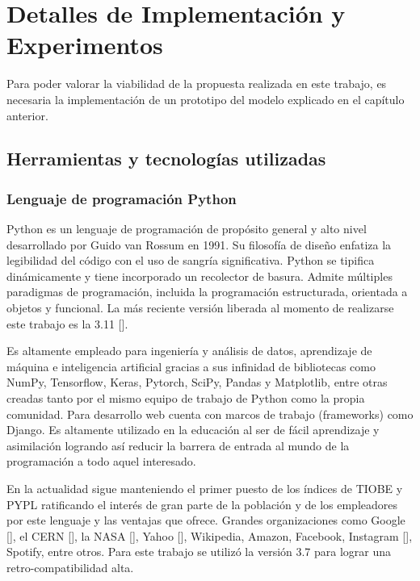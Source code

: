 \chapter{Detalles de Implementación y Experimentos}\label{chapter:implementation}
Para poder valorar la viabilidad de la propuesta realizada en este trabajo, es
necesaria la implementación de un prototipo del modelo explicado en el capítulo
anterior.

\section{Herramientas y tecnologías utilizadas}\label{section:implementation:techs}
\subsection{Lenguaje de programación Python}
Python es un lenguaje de programación de propósito general y alto nivel desarrollado por Guido van Rossum en 1991. Su filosofía de diseño enfatiza la legibilidad del código con el uso de sangría significativa. Python se tipifica dinámicamente y tiene incorporado un recolector de basura. Admite múltiples paradigmas de programación, incluida la programación estructurada, orientada a objetos y funcional. La más reciente  versión liberada al momento de realizarse este trabajo es la 3.11 [\cite{python_executive_summary_2022}].

Es altamente empleado para ingeniería y análisis de datos, aprendizaje de máquina
e inteligencia artificial gracias a sus infinidad de bibliotecas como NumPy, Tensorflow, Keras, Pytorch, SciPy, Pandas y Matplotlib, entre otras creadas tanto por el mismo equipo de trabajo de Python como la propia comunidad. Para desarrollo web cuenta con marcos de trabajo (frameworks) como Django. Es altamente utilizado en la educación al ser de fácil aprendizaje y asimilación logrando así reducir la barrera de entrada al mundo de la programación a todo aquel interesado.

 En la actualidad sigue manteniendo el primer puesto de los índices de TIOBE y PYPL ratificando el interés de gran parte de la población y de los empleadores por este lenguaje y las ventajas que ofrece. Grandes organizaciones como Google [\cite{quotes_about_python_2021}], el CERN [\cite{python_the_holy_grail_of_programming_2014}], la NASA [\cite{python_success_stories_2021}], Yahoo [\cite{organizationsusingpython}], Wikipedia, Amazon, Facebook, Instagram [\cite{meta_for_developers_2018}], Spotify, entre otros.
Para este trabajo se utilizó la versión 3.7 para lograr una retro-compatibilidad
alta.


